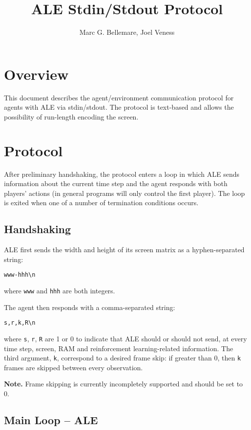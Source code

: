 \documentclass[12pt]{article}
\title{ALE Stdin/Stdout Protocol}
\author{Marc G. Bellemare, Joel Veness}
\begin{document}
\maketitle

\section{Overview}

This document describes the agent/environment communication protocol for agents with ALE via stdin/stdout. The protocol is text-based and allows the possibility of run-length encoding the screen.

\section{Protocol}

After preliminary handshaking, the protocol enters a loop in which ALE sends information about the current time step and the agent responds with both players' actions (in general programs will only control the first player). The loop is exited when one of a number of termination conditions occurs.

\subsection{Handshaking}

ALE first sends the width and height of its screen matrix as a hyphen-separated string:

\begin{verbatim}
www-hhh\n
\end{verbatim}

where \verb+www+ and \verb+hhh+ are both integers.

The agent then responds with a comma-separated string:

\begin{verbatim}
s,r,k,R\n
\end{verbatim}

where \verb+s+, \verb+r+, \verb+R+ are 1 or 0 to indicate that ALE should or should not send, at every time step, screen, RAM and reinforcement learning-related information. The third argument, \verb+k+, correspond to a desired frame skip: if greater than 0, then \verb+k+ frames are skipped between every observation.

\textbf{Note.} Frame skipping is currently incompletely supported and should be set to 0.

\subsection{Main Loop -- ALE}
\end{document}
